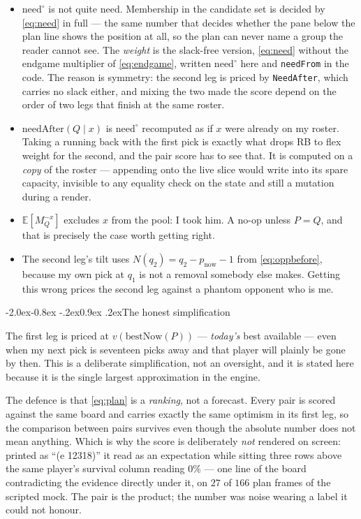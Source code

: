 \documentclass[10pt,a4paper]{article}
\makeatletter
\theoremstyle{plain}
\theoremstyle{definition}
\theoremstyle{remark}
\newcommand{\code}[1]{\texttt{\small #1}}
\renewcommand\subsection{\@startsection{subsection}{2}{\z@}%
  {-2.0ex\@plus -0.8ex \@minus -.2ex}{0.9ex \@plus .2ex}{\normalfont\large\bfseries}}
\makeatother
\begin{document}
\begin{itemize}
\item $\mathrm{need}^{\circ}$ is not quite $\mathrm{need}$. Membership in the candidate
set is decided by \eqref{eq:need} in full --- the same number that decides whether the
pane below the plan line shows the position at all, so the plan can never name a group
the reader cannot see. The \emph{weight} is the slack-free version, \eqref{eq:need}
without the endgame multiplier of \eqref{eq:endgame}, written $\mathrm{need}^{\circ}$
here and \code{needFrom} in the code. The reason is symmetry: the second leg is priced by
\code{NeedAfter}, which carries no slack either, and mixing the two made the score depend
on the order of two legs that finish at the same roster.

\item $\mathrm{needAfter}(Q \mid x)$ is $\mathrm{need}^{\circ}$ recomputed as if $x$ were
already on my roster. Taking a running back with the first pick is exactly what drops RB
to flex weight for the second, and the pair score has to see that. It is computed on a
\emph{copy} of the roster --- appending onto the live slice would write into its spare
capacity, invisible to any equality check on the state and still a mutation during a
render.

\item $\mathbb{E}[M_Q^{-x}]$ excludes $x$ from the pool: I took him. A no-op unless
$P = Q$, and that is precisely the case worth getting right.

\item The second leg's tilt uses $N(q_2) = q_2 - p_{\text{now}} - 1$ from
\eqref{eq:oppbefore}, because my own pick at $q_1$ is not a removal somebody else makes.
Getting this wrong prices the second leg against a phantom opponent who is me.
\end{itemize}

\subsection{The honest simplification}

The first leg is priced at $v(\mathrm{bestNow}(P))$ --- \emph{today's} best available ---
even when my next pick is seventeen picks away and that player will plainly be gone by
then. This is a deliberate simplification, not an oversight, and it is stated here
because it is the single largest approximation in the engine.

The defence is that \eqref{eq:plan} is a \emph{ranking}, not a forecast. Every pair is
scored against the same board and carries exactly the same optimism in its first leg, so
the comparison between pairs survives even though the absolute number does not mean
anything. Which is why the score is deliberately \emph{not} rendered on screen: printed
as ``(e 12318)'' it read as an expectation while sitting three rows above the same
player's survival column reading $0\%$ --- one line of the board contradicting the
evidence directly under it, on $27$ of $166$ plan frames of the scripted mock. The pair
is the product; the number was noise wearing a label it could not honour.
\end{document}
